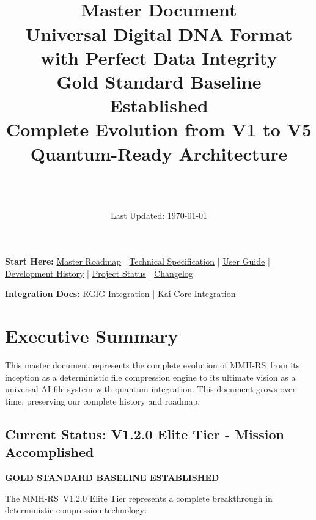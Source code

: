 \documentclass[12pt,a4paper]{article}
\title{\Huge\textbf{\project\ \version}\\[0.5cm]
\Large\textbf{Master Document}\\[0.3cm]
\large Universal Digital DNA Format with Perfect Data Integrity\\[0.5cm]
\large Gold Standard Baseline Established\\[0.3cm]
\large Complete Evolution from V1 to V5\\[0.3cm]
\large Quantum-Ready Architecture}
\author{\Large\authorname\\[0.2cm]\email\\[0.2cm]\github}
\date{\large Last Updated: \today}
\newcommand{\project}{MMH-RS}
\begin{document}
\maketitle
\thispagestyle{empty}

\begin{tcolorbox}[colback=blue!10,colframe=blue!50,title=\textbf{Full Documentation Suite}]
\textbf{Start Here:} \href{MMH-RS_ROADMAP_COMPLETE.pdf}{Master Roadmap} | \href{MMH-RS_TECHNICAL_COMPLETE.pdf}{Technical Specification} | \href{USER_GUIDE.md}{User Guide} | \href{DEVELOPMENT_HISTORY.md}{Development History} | \href{PROJECT_STATUS.md}{Project Status} | \href{CHANGELOG.md}{Changelog}

\textbf{Integration Docs:} \href{RGIG_INTEGRATION_COMPLETE.pdf}{RGIG Integration} | \href{KAI_CORE_INTEGRATION_COMPLETE.pdf}{Kai Core Integration}
\end{tcolorbox}

\tableofcontents
\newpage

\section{Executive Summary}

This master document represents the complete evolution of \project\ from its inception as a deterministic file compression engine to its ultimate vision as a universal AI file system with quantum integration. This document grows over time, preserving our complete history and roadmap.

\subsection{Current Status: V1.2.0 Elite Tier - Mission Accomplished}

\textbf{GOLD STANDARD BASELINE ESTABLISHED}

The \project\ V1.2.0 Elite Tier represents a complete breakthrough in deterministic compression technology:
\end{document}
